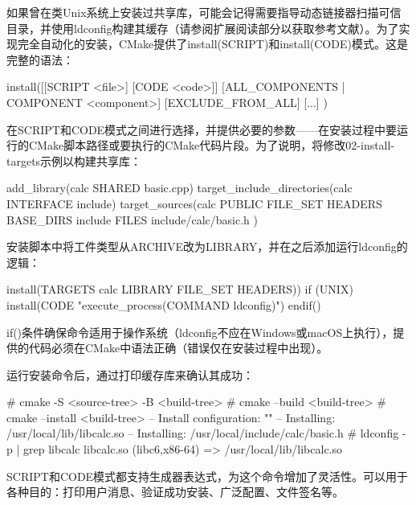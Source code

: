 
如果曾在类Unix系统上安装过共享库，可能会记得需要指导动态链接器扫描可信目录，并使用ldconfig构建其缓存（请参阅扩展阅读部分以获取参考文献）。为了实现完全自动化的安装，CMake提供了install(SCRIPT)和install(CODE)模式。这是完整的语法：

\begin{shell}
install([[SCRIPT <file>] [CODE <code>]]
        [ALL_COMPONENTS | COMPONENT <component>]
        [EXCLUDE_FROM_ALL] [...]
)
\end{shell}

在SCRIPT和CODE模式之间进行选择，并提供必要的参数——在安装过程中要运行的CMake脚本路径或要执行的CMake代码片段。为了说明，将修改02-install-targets示例以构建共享库：


\begin{cmake}
add_library(calc SHARED basic.cpp)
target_include_directories(calc INTERFACE include)
target_sources(calc PUBLIC FILE_SET HEADERS
                           BASE_DIRS include
                           FILES include/calc/basic.h
)
\end{cmake}

安装脚本中将工件类型从ARCHIVE改为LIBRARY，并在之后添加运行ldconfig的逻辑：


\begin{cmake}
install(TARGETS calc LIBRARY FILE_SET HEADERS))
if (UNIX)
    install(CODE "execute_process(COMMAND ldconfig)")
endif()
\end{cmake}

if()条件确保命令适用于操作系统（ldconfig不应在Windows或macOS上执行），提供的代码必须在CMake中语法正确（错误仅在安装过程中出现）。

运行安装命令后，通过打印缓存库来确认其成功：

\begin{shell}
# cmake -S <source-tree> -B <build-tree>
# cmake --build <build-tree>
# cmake --install <build-tree>
-- Install configuration: ""
-- Installing: /usr/local/lib/libcalc.so
-- Installing: /usr/local/include/calc/basic.h
# ldconfig -p | grep libcalc
        libcalc.so (libc6,x86-64) => /usr/local/lib/libcalc.so
\end{shell}

SCRIPT和CODE模式都支持生成器表达式，为这个命令增加了灵活性。可以用于各种目的：打印用户消息、验证成功安装、广泛配置、文件签名等。

